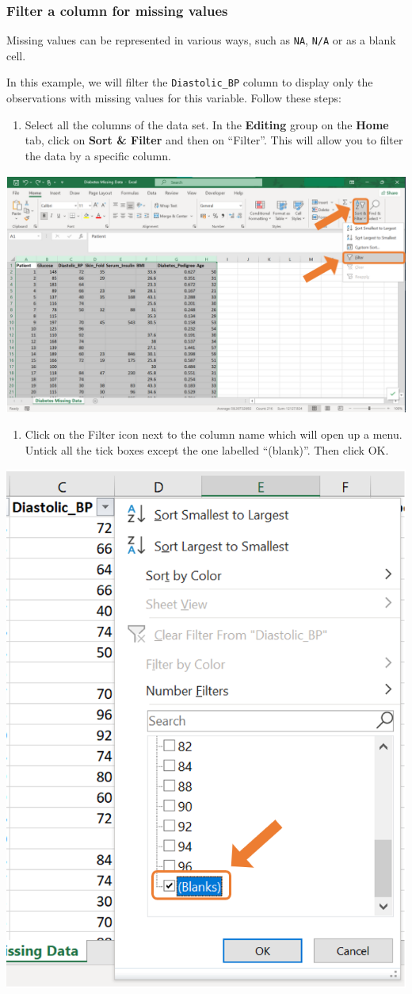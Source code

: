 \documentclass[
]{book}
\providecommand{\tightlist}{%
  \setlength{\itemsep}{0pt}\setlength{\parskip}{0pt}}
\begin{document}
\subsubsection*{Filter a column for missing values}\label{filter-a-column-for-missing-values}

Missing values can be represented in various ways, such as \texttt{NA}, \texttt{N/A} or as a blank cell.

In this example, we will filter the \texttt{Diastolic\_BP} column to display only the observations with missing values for this variable. Follow these steps:

\newpage

\begin{enumerate}
\def\labelenumi{\arabic{enumi}.}
\tightlist
\item
  Select all the columns of the data set. In the \textbf{Editing} group on the \textbf{Home} tab, click on \textbf{Sort \& Filter} and then on ``Filter''. This will allow you to filter the data by a specific column.
\end{enumerate}

\begin{center}\includegraphics[width=0.8\linewidth]{Figures/missing_1_1} \end{center}

\begin{enumerate}
\def\labelenumi{\arabic{enumi}.}
\setcounter{enumi}{1}
\tightlist
\item
  Click on the Filter icon next to the column name which will open up a menu. Untick all the tick boxes except the one labelled ``(blank)''. Then click OK.
\end{enumerate}

\begin{center}\includegraphics[width=0.4\linewidth]{Figures/missing_1_2} \end{center}
\end{document}
